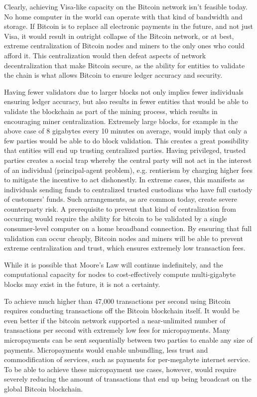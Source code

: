 \documentclass[letterpaper,11pt]{article}
\begin{document}
Clearly, achieving Visa-like capacity on the Bitcoin network isn't feasible
today. No home computer in the world can operate with that kind of bandwidth and
storage. If Bitcoin is to replace all electronic payments in the future, and not
just Visa, it would result in outright collapse of the Bitcoin network, or at
best, extreme centralization of Bitcoin nodes and miners to the only ones who
could afford it. This centralization would then defeat aspects of network
decentralization that make Bitcoin secure, as the ability for entities to
validate the chain is what allows Bitcoin to ensure ledger accuracy and
security.

Having fewer validators due to larger blocks not only implies fewer individuals
ensuring ledger accuracy, but also results in fewer entities that would be able
to validate the blockchain as part of the mining process, which results in
encouraging miner centralization. Extremely large blocks, for example in the
above case of 8 gigabytes every 10 minutes on average, would imply that only a
few parties would be able to do block validation. This creates a great
possibility that entities will end up trusting centralized parties. Having
privileged, trusted parties creates a social trap whereby the central party will
not act in the interest of an individual (principal-agent problem), e.g.
rentierism by charging higher fees to mitigate the incentive to act dishonestly.
In extreme cases, this manifests as individuals sending funds to centralized
trusted custodians who have full custody of customers' funds. Such arrangements,
as are common today, create severe counterparty risk. A prerequisite to prevent
that kind of centralization from occurring would require the ability for bitcoin
to be validated by a single consumer-level computer on a home broadband
connection. By ensuring that full validation can occur cheaply, Bitcoin nodes
and miners will be able to prevent extreme centralization and trust, which
ensures extremely low transaction fees.

While it is possible that Moore's Law will continue indefinitely, and the
computational capacity for nodes to cost-effectively compute multi-gigabyte
blocks may exist in the future, it is not a certainty.

To achieve much higher than 47,000 transactions per second using Bitcoin
requires conducting transactions off the Bitcoin blockchain itself. It would be
even better if the bitcoin network supported a near-unlimited number of
transactions per second with extremely low fees for micropayments. Many
micropayments can be sent sequentially between two parties to enable any size
of payments. Micropayments would enable unbundling, less trust and
commodification of services, such as payments for per-megabyte internet
service. To be able to achieve these micropayment use cases, however, would
require severely reducing the amount of transactions that end up being
broadcast on the global Bitcoin blockchain.
\end{document}
